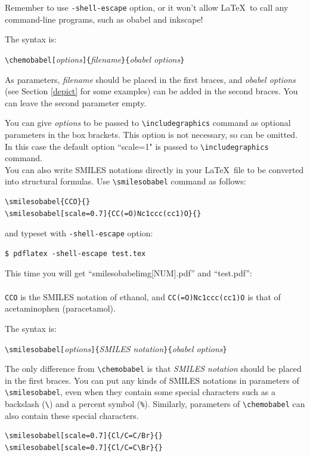 \documentclass[12pt]{jsarticle}
\begin{document}
Remember to use \verb|-shell-escape| option, or it won't allow \LaTeX\ to call any command-line programs, such as obabel and inkscape!

The syntax is:
\begin{center}
\verb|\chemobabel[|\textit{options}\verb|]{|\textit{filename}\verb|}{|\textit{obabel options}\verb|}|
\end{center}
As parameters, \textit{filename} should be placed in the first braces, and \textit{obabel options} (see Section \ref{depict} for some examples) can be added in the second braces.
You can leave the second parameter empty.

You can give \textit{options} to be passed to \verb|\includegraphics| command as optional parameters in the box brackets.
This option is not necessary, so can be omitted. In this case the default option ``scale=1" is passed to \verb|\includegraphics| command. \\

You can also write SMILES notations directly in your \LaTeX\ file to be converted into structural formulas.
Use \verb|\smilesobabel| command as follows:
\begin{verbatim}
\smilesobabel{CCO}{}
\smilesobabel[scale=0.7]{CC(=O)Nc1ccc(cc1)O}{}
\end{verbatim}
and typeset with \verb|-shell-escape| option:
\begin{verbatim}
$ pdflatex -shell-escape test.tex
\end{verbatim}
This time you will get ``smilesobabelimg[NUM].pdf'' and ``test.pdf'': \\
 \\
\verb|CCO| is the SMILES notation of ethanol, and \verb|CC(=O)Nc1ccc(cc1)O| is that of acetaminophen (paracetamol).

The syntax is:
\begin{center}
\verb|\smilesobabel[|\textit{options}\verb|]{|\textit{SMILES notation}\verb|}{|\textit{obabel options}\verb|}|
\end{center}
The only difference from \verb|\chemobabel| is that \textit{SMILES notation} should be placed in the first braces.
You can put any kinds of SMILES notations in parameters of \verb|\smilesobabel|, even when they contain some special characters such as a backslash (\verb|\|) and a percent symbol (\verb|%|).
Similarly, parameters of \verb|\chemobabel| can also contain these special characters.
\begin{verbatim}
\smilesobabel[scale=0.7]{Cl/C=C/Br}{}
\smilesobabel[scale=0.7]{Cl/C=C\Br}{}
\end{verbatim}
\end{document}
